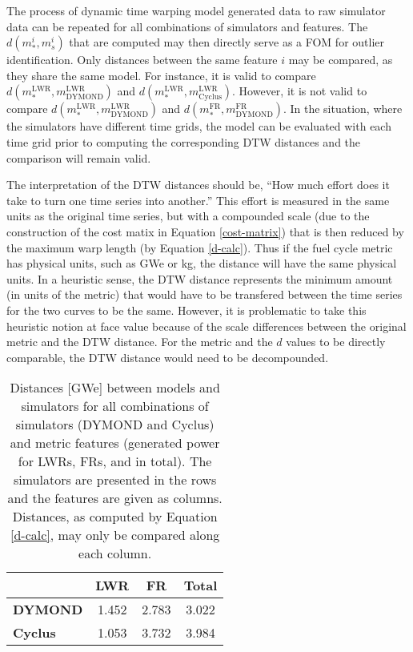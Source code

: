 \documentclass{ntmanuscript}
\newcommand{\LWR}{\mathrm{LWR}}
\newcommand{\FR}{\mathrm{FR}}
\newcommand{\CYCLUS}{\mathrm{Cyclus}}
\newcommand{\DYMOND}{\mathrm{DYMOND}}
\begin{document}
The process of dynamic time warping model generated data to raw simulator data can be
repeated for all combinations of simulators and features. The
$d(m_*^i, m_s^i)$ that are computed may then directly serve as a FOM for
outlier identification. Only distances between the same feature $i$ may be compared,
as they share the same model. For instance, it is valid to compare
$d(m_*^\LWR, m_\DYMOND^\LWR)$ and $d(m_*^\LWR, m_\CYCLUS^\LWR)$. However,
it is not valid to compare $d(m_*^\LWR, m_\DYMOND^\LWR)$ and
$d(m_*^\FR, m_\DYMOND^\FR)$.  In the situation, where the simulators
have different time grids, the model can be evaluated with each time grid
prior to computing the corresponding DTW distances and the comparison will
remain valid.

The interpretation of the DTW distances should be, ``How much effort does
it take to turn one time series into another.'' This effort is measured
in the same units as the original time series, but with a compounded
scale (due to the construction of the cost matix in Equation \ref{cost-matrix})
that is then reduced by
the maximum warp length (by Equation \ref{d-calc}). Thus if the fuel
cycle metric has physical units, such as GWe or kg, the distance will have
the same physical units. In a heuristic sense, the DTW distance represents
the minimum amount (in units of the metric) that would have to be transfered
between the time series for the two curves to be the same. However, it is
problematic to take this heuristic notion at face value because of the
scale differences between the original metric and the DTW distance.
For the metric and the $d$ values to be directly comparable, the DTW distance
would need to be decompounded.

\begin{table}[htb]
\centering
\caption{Distances [GWe] between models and simulators for all combinations of
simulators (DYMOND and Cyclus) and metric features (generated power for
LWRs, FRs, and in total). The simulators are presented in the rows and the
features are given as columns. Distances, as computed by
Equation \ref{d-calc}, may only be compared along each column.}
\label{d-compare}
\begin{tabular}{l||c||c||c|}
                & \textbf{LWR} & \textbf{FR} & \textbf{Total} \\
\hline
\textbf{DYMOND} & 1.452        & 2.783       & 3.022          \\
\hline
\textbf{Cyclus} & 1.053        & 3.732       & 3.984          \\
\hline
\end{tabular}
\end{table}
\end{document}
